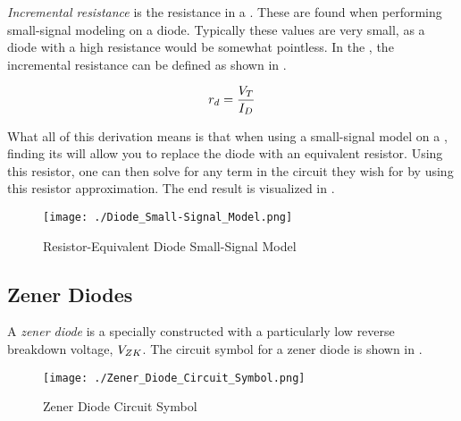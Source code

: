 \begin{definition}\label{def:Incremental_Resistance}
  \emph{Incremental resistance} is the resistance in a .
  These are found when performing small-signal modeling on a diode.
  Typically these values are very small, as a diode with a high resistance would be somewhat pointless.
  In the , the incremental resistance can be defined as shown in .

  \begin{equation}\label{eq:Incremental_Resistance-Small-Signal_Model}
    r_{d} = \frac{V_{T}}{I_{D}}
  \end{equation}
\end{definition}

What all of this derivation means is that when using a small-signal model on a , finding its  will allow you to replace the diode with an equivalent resistor.
Using this resistor, one can then solve for any term in the circuit they wish for by using this resistor approximation.
The end result is visualized in .

\begin{figure}[h!tbp]
  \centering
  \texttt{[image: ./Diode\_Small-Signal\_Model.png]}
  \caption{Resistor-Equivalent Diode Small-Signal Model \parencite[p.~198]{sedraTextbook7}}
  \label{fig:Diode_Small-Signal_Approximation}
\end{figure}

\subsection{Zener Diodes}\label{subsec:Zener_Diodes}
\begin{definition}\label{def:Zener_Diode}
  A \emph{zener diode} is a specially constructed  with a particularly low reverse breakdown voltage, $V_{ZK}$.
  The circuit symbol for a zener diode is shown in .
\end{definition}

\begin{figure}[h!tbp]
  \centering
  \texttt{[image: ./Zener\_Diode\_Circuit\_Symbol.png]}
  \caption{Zener Diode Circuit Symbol \parencite[p.~202]{sedraTextbook7}}
  \label{fig:Zener_Diode_Circuit_Symbol}
\end{figure}

